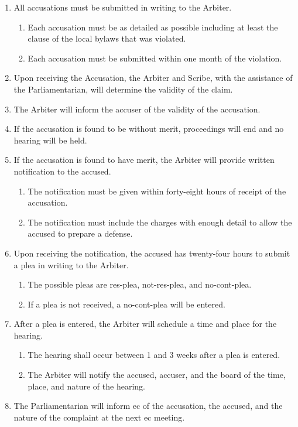 	\begin{enumerate}
		\item All accusations must be submitted in writing to the Arbiter. 
			\begin{enumerate}
				\item Each accusation must be as detailed as possible including at least the clause of the local bylaws that was violated.
				\item Each accusation must be submitted within one month of the violation.
			\end{enumerate}

		\item Upon receiving the Accusation, the Arbiter and Scribe, with the assistance of the Parliamentarian, will determine the validity of the claim.
		\item The Arbiter will inform the accuser of the validity of the accusation.
		\item If the accusation is found to be without merit, proceedings will end and no hearing will be held.
		\item If the accusation is found to have merit, the Arbiter will provide written notification to the accused.
			\begin{enumerate}
				\item The notification must be given within forty-eight hours of receipt of the accusation.
				\item The notification must include the charges with enough detail to allow the accused to prepare a defense.
			\end{enumerate}
		\item Upon receiving the notification, the accused has twenty-four hours to submit a plea in writing to the Arbiter.
			\begin{enumerate}
				\item The possible pleas are \gls{res-plea}, \gls{not-res-plea}, and \gls{no-cont-plea}.
				\item If a plea is not received, a \gls{no-cont-plea} will be entered.
			\end{enumerate}

		\item After a plea is entered, the Arbiter will schedule a time and place for the hearing.
			\begin{enumerate}
				\item The hearing shall occur between 1 and 3 weeks after a plea is entered.
				\item The Arbiter will notify the accused, accuser, and the board of the time, place, and nature of the hearing.
			\end{enumerate}

		\item The Parliamentarian will inform \gls{ec} of the accusation, the accused, and the nature of the complaint at the next \gls{ec} meeting.

	\end{enumerate}

